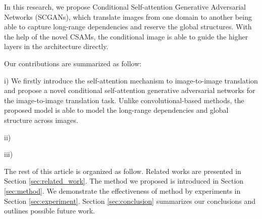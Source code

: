 In this research, we propose Conditional Self-attention Generative Adversarial Networks (SCGANs), which translate images from one domain to another being able to capture long-range dependencies and reserve the global structures. With the help of the novel CSAMs, the conditional image is able to guide the higher layers in the architecture directly.  

Our contributions are summarized as follow:

i) We firstly introduce the self-attention mechanism to image-to-image translation and propose a novel conditional self-attention generative adversarial networks for the image-to-image translation task. Unlike convolutional-based methods, the proposed model is able to model the long-range dependencies and global structure across images.

ii)

iii)

The rest of this article is organized as follow. Related works are presented in Section \ref{sec:related_work}. The method we proposed is introduced in Section \ref{sec:method}. We demonstrate the effectiveness of method by experiments in Section \ref{sec:experiment}. Section \ref{sec:conclusion} summarizes our conclusions and outlines possible future work.